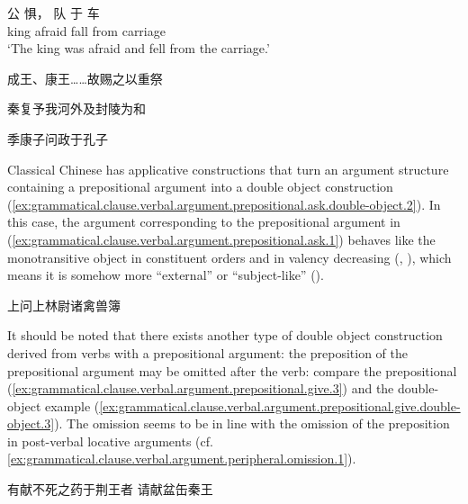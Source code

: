 \documentclass[UTF8, a4paper, oneside, scheme=plain, 12pt]{ctexrep}
\newcommand{\translate}[1]{`#1'}
\begin{document}
\begin{exe}
    \ex\label{ex:grammatical.clause.verbal.argument.prepositional.1} 
    \gll 公 惧， 队 于 车 \\
    king afraid fall from carriage \\
    \glt\translate{The king was afraid and fell from the carriage.}

    \ex\label{ex:grammatical.clause.verbal.argument.prepositional.give.1}  成王、康王……故赐之以重祭

    \ex\label{ex:grammatical.clause.verbal.argument.prepositional.give.2} 秦复予我河外及封陵为和

    \ex\label{ex:grammatical.clause.verbal.argument.prepositional.ask.1} 季康子问政于孔子
\end{exe}

Classical Chinese has applicative constructions that
turn an argument structure containing a prepositional argument into a double object construction
(\ref{ex:grammatical.clause.verbal.argument.prepositional.ask.double-object.2}).
In this case, the argument corresponding to the prepositional argument in (\ref{ex:grammatical.clause.verbal.argument.prepositional.ask.1})
behaves like the monotransitive object in constituent orders and in valency decreasing
(, ),
which means it is somehow more ``external'' or ``subject-like'' ().

\begin{exe}
    \ex\label{ex:grammatical.clause.verbal.argument.prepositional.ask.double-object.2} 上问上林尉诸禽兽簿
\end{exe}

It should be noted that there exists another type of double object construction
derived from verbs with a prepositional argument:
the preposition of the prepositional argument may be omitted after the verb:
compare the prepositional (\ref{ex:grammatical.clause.verbal.argument.prepositional.give.3})
and the double-object example (\ref{ex:grammatical.clause.verbal.argument.prepositional.give.double-object.3}).
The omission seems to be in line with the omission of the preposition in post-verbal locative arguments (cf. \ref{ex:grammatical.clause.verbal.argument.peripheral.omission.1}).

\begin{exe}
    \ex\label{ex:grammatical.clause.verbal.argument.prepositional.give.3} 有献不死之药于荆王者
    \ex\label{ex:grammatical.clause.verbal.argument.prepositional.give.double-object.3}  请献盆缶秦王 
\end{exe}
\end{document}
